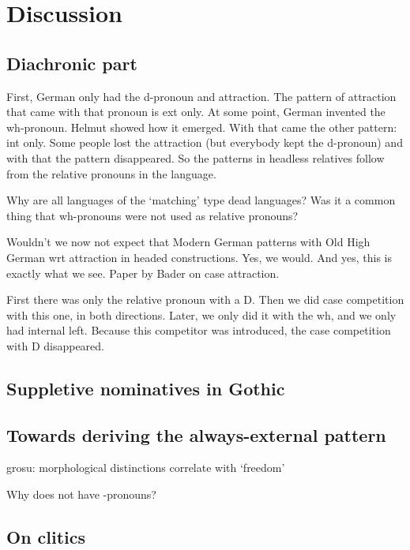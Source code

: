 
\chapter{Discussion}\label{ch:discussion}


\section{Diachronic part}

First, German only had the d-pronoun and attraction. The pattern of attraction that came with that pronoun is ext only.
At some point, German invented the wh-pronoun. Helmut showed how it emerged. With that came the other pattern: int only. Some people lost the attraction (but everybody kept the d-pronoun) and with that the pattern disappeared.
So the patterns in headless relatives follow from the relative pronouns in the language.

Why are all languages of the `matching' type dead languages?
Was it a common thing that wh-pronouns were not used as relative pronouns?

Wouldn't we now not expect that Modern German patterns with Old High German wrt attraction in headed constructions. Yes, we would. And yes, this is exactly what we see. Paper by Bader on case attraction.

First there was only the relative pronoun with a D. Then we did case competition with this one, in both directions. Later, we only did it with the wh, and we only had internal left. Because this competitor was introduced, the case competition with D disappeared.


\section{Suppletive nominatives in Gothic}




\section{Towards deriving the always-external pattern}

grosu: morphological distinctions correlate with `freedom'

Why  does not have -pronouns?


\section{On clitics}

